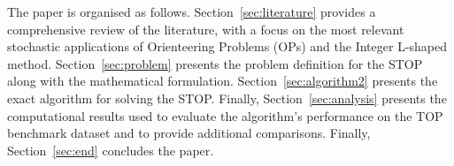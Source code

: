 \documentclass[11pt]{article}
\theoremstyle{definition}
\begin{document}

The paper is organised as follows.
%
Section~\ref{sec:literature} provides a comprehensive review of the literature, with a focus on the most relevant stochastic applications of Orienteering Problems (OPs) and the Integer L-shaped method.
%
Section~\ref{sec:problem} presents the problem definition for the STOP along with the mathematical formulation.
%
Section~\ref{sec:algorithm2} presents the exact algorithm for solving the STOP. %
%
Finally, Section~\ref{sec:analysis} presents the computational results used to evaluate the algorithm’s performance on the TOP benchmark dataset and to provide additional comparisons.
%
%
Finally, Section~\ref{sec:end} concludes the paper.
\end{document}
